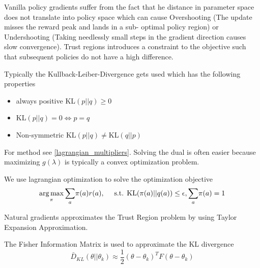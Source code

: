 \begin{enumerate}
\newline Vanilla policy gradients suffer from the fact that he distance in parameter space does
not translate into policy space which can cause Overshooting (The update misses the reward peak and lands in a sub- optimal policy region) or Undershooting (Taking needlessly small steps in the gradient direction causes slow convergence). Trust regions introduces a constraint to the objective such that subsequent policies
do not have a high difference. 

\newline Typically the Kullback-Leiber-Divergence gets used which has the following properties \begin{itemize}
    \item always positive KL$(p||q)\geq 0$
    \item KL$(p||q) = 0 \iff p=q$
    \item Non-symmetric KL$(p||q)\neq$KL$(q||p)$
\end{itemize}

\newline
For method see \ref{lagrangian_multipliers}. Solving the dual is often easier because maximizing $g(\lambda)$ is typically a convex optimization problem.

\newline
We use lagrangian optimization to solve the optimization  objective
$$\operatorname*{arg\,max}\limits_\pi \underset{a}{\sum}\pi(a)r(a),\quad
\text{ s.t. KL}(\pi(a)||q(a))\leq \epsilon,\underset{a}{\sum}\pi(a) =1 $$

\newline
Natural gradients approximates the Trust Region problem by using Taylor Expansion Approximation.

\newline
The Fisher Information Matrix is used to approximate the KL divergence
$$\bar{D}_{KL}(\theta || \theta_k)  \approx \frac{1}{2} (\theta - \theta_k)^T F (\theta - \theta_k)$$


\end{enumerate}
